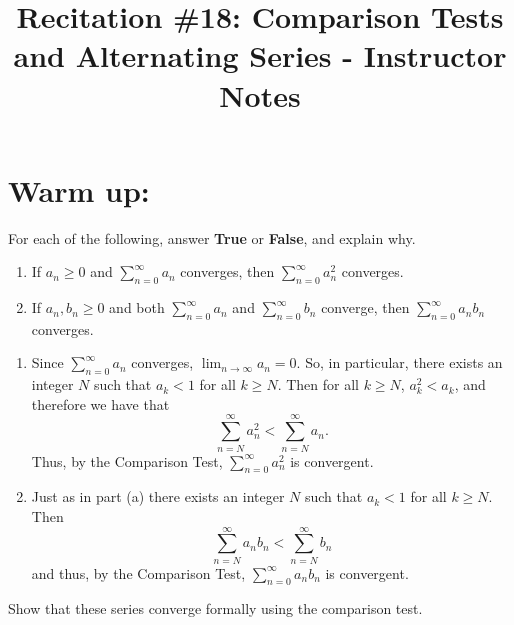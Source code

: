 \documentclass[handout,instructornotes]{ximera}
\title{Recitation \#18: Comparison Tests and Alternating Series - Instructor Notes}
\begin{document}
\begin{abstract}		\end{abstract}
\maketitle



\section{Warm up:}
For each of the following, answer {\bf True} or {\bf False}, and explain why.
	\begin{enumerate}
	
	\item  If $a_n \geq 0$ and $\sum_{n=0}^\infty a_n$ converges, then $\sum_{n=0}^\infty a_n^2$ converges.
	
	\item  If $a_n, b_n \geq 0$ and both $\sum_{n=0}^\infty a_n$ and $\sum_{n=0}^\infty b_n$ converge, then $\sum_{n=0}^\infty a_n b_n$ converges. 
	
	\end{enumerate}
	
	\begin{freeResponse}
		\begin{enumerate}
		
		\item  {}
		
		Since $\sum_{n=0}^\infty a_n$ converges, $\lim_{n \to \infty} a_n = 0$.  
		So, in particular, there exists an integer $N$ such that $a_k < 1$ for all $k \geq N$.  
		Then for all $k \geq N$, $a_k^2 < a_k$, and therefore we have that
			\[
			\sum_{n=N}^\infty a_n^2 < \sum_{n=N}^\infty a_n.
			\]
		Thus,  by the Comparison Test, $\sum_{n=0}^\infty a_n^2$ is convergent.
		
		
		
		\item  {}
		
		Just as in part (a) there exists an integer $N$ such that $a_k < 1$ for all $k \geq N$.  
		Then
			\[
			\sum_{n=N}^\infty a_n b_n < \sum_{n=N}^\infty b_n
			\]
		and thus, by the Comparison Test, $\sum_{n=0}^\infty a_n b_n$ is convergent.
		
		\end{enumerate}
	\end{freeResponse}
	
\begin{instructorNotes}
Show that these series converge formally using the comparison test.
\end{instructorNotes}
\end{document}
